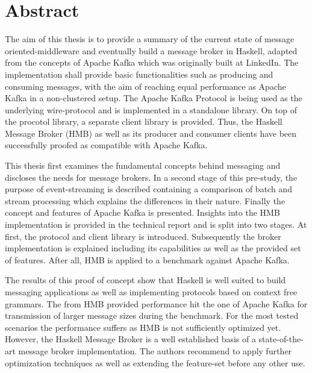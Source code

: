 \chapter{Abstract}

The aim of this thesis is to provide a summary of the current state of message
oriented-middleware and eventually build a message broker in Haskell, adapted
from the concepts of Apache Kafka which was originally built at LinkedIn. The
implementation shall provide basic functionalities such as producing and
consuming messages, with the aim of reaching equal performance as Apache Kafka
in a non-clustered setup. The Apache Kafka Protocol is being used as the
underlying wire-protocol and is implemented in a standalone library. On top of
the procotol library, a separate client library is provided. Thus, the Haskell
Message Broker (HMB) as well as its producer and consumer clients have been
successfully proofed as compatible with Apache Kafka.

This thesis first examines the fundamental concepts behind messaging and
discloses the needs for message brokers.  In a second stage of this
pre-study, the purpose of event-streaming is described containing a
comparison of batch and stream processing which explains the
differences in their nature. Finally the concept and features of Apache
Kafka is presented.  Insights into the HMB implementation is provided in the
technical report and is split into two stages.  At first, the protocol
and client library is introduced. Subsequently the broker implementation
is explained including its capabilities as well as the provided
set of features. After all, HMB is applied to a benchmark against
Apache Kafka.

The results of this proof of concept show that Haskell is well suited to build
messaging applications as well as implementing protocols based on context free
grammars. The from HMB provided performance hit the one of Apache Kafka for
transmission of larger message sizes during the benchmark. For the most tested
scenarios the performance suffers as HMB is not sufficiently optimized yet.
However, the Haskell Message Broker is a well established basis of a
state-of-the-art message broker implementation. The authors recommend to apply
further optimization techniques as well as extending the feature-set before any
other use.
